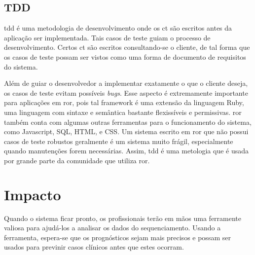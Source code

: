 \subsection{TDD}

\gls{tdd} é uma metodologia de desenvolvimento onde os \gls{ct} são escritos antes da aplicação ser implementada. Tais casos de teste guiam
o processo de desenvolvimento. Certos \gls{ct} são escritos consultando-se o cliente, de tal forma que os casos de teste possam ser
vistos como uma forma de documento de requisitos do sistema. 

Além de guiar o desenvolvedor a implementar exatamente o que o cliente deseja, os casos de teste evitam possíveis \textit{bugs}. Esse aspecto
é extremamente importante para aplicações em \gls{ror}, pois tal framework é uma extensão da linguagem Ruby, uma linguagem com sintaxe e semântica bastante
flexissíveis e permissivas. \gls{ror} também conta com algumas outras ferramentas para o funcionamento do sistema, como Javascript, SQL, HTML, e CSS.
Um sistema escrito em \gls{ror} que não possui casos de teste robustos geralmente é um sistema muito frágil, especialmente quando manutenções forem necessárias.
Assim, \gls{tdd} é uma metologia que é usada por grande parte da comunidade que utiliza \gls{ror}.


%

\section{Impacto}

Quando o sistema ficar pronto, os profissionais terão em mãos uma ferramente valiosa para ajudá-los a analisar os dados
do sequenciamento. Usando a ferramenta, espera-se que os prognósticos sejam mais precisos e possam ser usados para
previnir casos clínicos antes que estes ocorram.

